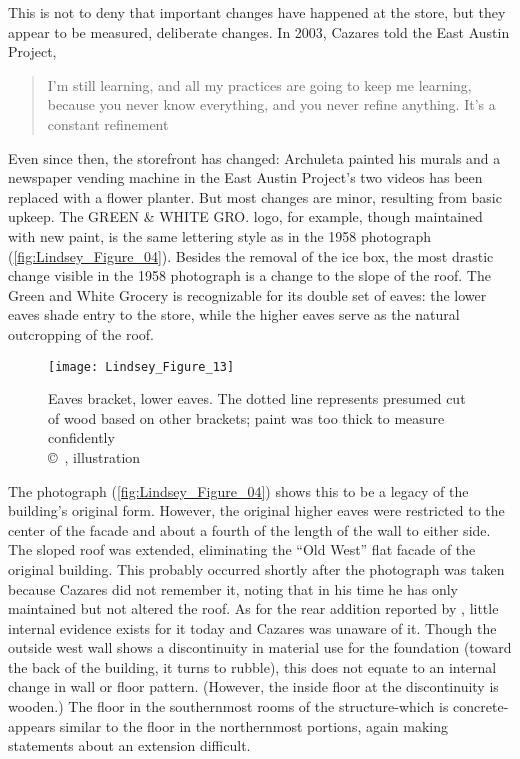 This is not to deny that important changes have happened at the store, but they appear to be measured, deliberate changes. In 2003, Cazares told the East Austin Project, \blockcquote{becker}{I'm still learning, and all my practices are going to keep me learning, because you never know everything, and you never refine anything. It's a constant refinement}. Even since then, the storefront has changed: Archuleta painted his murals and a newspaper vending machine in the East Austin Project’s two videos has been replaced with a flower planter. But most changes are minor, resulting from basic upkeep. The GREEN \& WHITE GRO. logo, for example, though maintained with new paint, is the same lettering style as in the 1958 photograph (\cref{fig:Lindsey_Figure_04}). Besides the removal of the ice box, the most drastic change visible in the 1958 photograph is a change to the slope of the roof. The Green and White Grocery is recognizable for its double set of eaves: the lower eaves shade entry to the store, while the higher eaves serve as the natural outcropping of the roof.

\begin{figure}[!tb]
	\texttt{[image: Lindsey\_Figure\_13]}
	\caption{Eaves bracket, lower eaves. The dotted line represents presumed cut of wood based on other brackets; paint was too thick to measure confidently\\
		{\normalfont\scriptsize \copyright\
			\shortauthor, illustration
	}}
	\label{fig:Lindsey_Figure_13}
\end{figure}

The photograph (\cref{fig:Lindsey_Figure_04}) shows this to be a legacy of the building's original form. However, the original higher eaves were restricted to the center of the facade and about a fourth of the length of the wall to either side. The sloped roof was extended, eliminating the “Old West” flat facade of the original building. This probably occurred shortly after the photograph was taken because Cazares did not remember it, noting that in his time he has only maintained but not altered the roof.  As for the rear addition reported by \textcite[75-76]{hardy}, little internal evidence exists for it today and Cazares was unaware of it. Though the outside west wall shows a discontinuity in material use for the foundation (toward the back of the building, it turns to rubble), this does not equate to an internal change in wall or floor pattern. (However, the inside floor at the discontinuity is wooden.) The floor in the southernmost rooms of the structure-which is concrete-appears similar to the floor in the northernmost portions, again making statements about an extension difficult.

